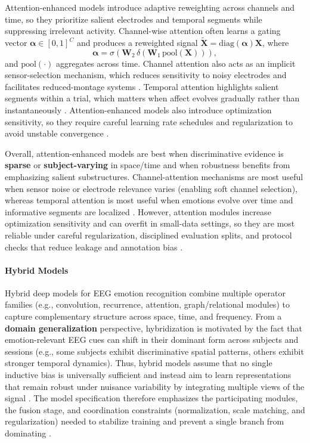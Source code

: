\documentclass{WileyMSP-template}
\begin{document}
Attention-enhanced models introduce adaptive reweighting across channels and time, so they prioritize salient electrodes and temporal segments while suppressing irrelevant activity. Channel-wise attention often learns a gating vector $\boldsymbol{\alpha}\in[0,1]^C$ and produces a reweighted signal $\tilde{\mathbf{X}}=\mathrm{diag}(\boldsymbol{\alpha})\mathbf{X}$, where \begin{equation} \boldsymbol{\alpha}=\sigma\!\left(\mathbf{W}_2\,\delta(\mathbf{W}_1\,\mathrm{pool}(\mathbf{X}))\right), \end{equation} and $\mathrm{pool}(\cdot)$ aggregates across time. Channel attention also acts as an implicit sensor-selection mechanism, which reduces sensitivity to noisy electrodes and facilitates reduced-montage systems \cite{jweijl2018learning,jxingk2018adaptive}. Temporal attention highlights salient segments within a trial, which matters when affect evolves gradually rather than instantaneously \cite{tzhang2019spatialt}. Attention-enhanced models also introduce optimization sensitivity, so they require careful learning rate schedules and regularization to avoid unstable convergence \cite{yroyhb2019deeplear}.

Overall, attention-enhanced models are best when discriminative evidence is \textbf{sparse} or \textbf{subject-varying} in space/time and when robustness benefits from emphasizing salient substructures. Channel-attention mechanisms are most useful when sensor noise or electrode relevance varies (enabling soft channel selection), whereas temporal attention is most useful when emotions evolve over time and informative segments are localized \cite{jweijl2018learning,jxingk2018adaptive,tzhang2019spatialt}. However, attention modules increase optimization sensitivity and can overfit in small-data settings, so they are most reliable under careful regularization, disciplined evaluation splits, and protocol checks that reduce leakage and annotation bias \cite{yroyhb2019deeplear}.


\paragraph{Hybrid Models}
\label{sec:hybrid_models}

Hybrid deep models for EEG emotion recognition combine multiple operator families (e.g., convolution, recurrence, attention, graph/relational modules) to capture complementary structure across space, time, and frequency. From a \textbf{domain generalization} perspective, hybridization is motivated by the fact that emotion-relevant EEG cues can shift in their dominant form across subjects and sessions (e.g., some subjects exhibit discriminative spatial patterns, others exhibit stronger temporal dynamics). Thus, hybrid models assume that no single inductive bias is universally sufficient and instead aim to learn representations that remain robust under nuisance variability by integrating multiple views of the signal \cite{sliuxw2020subjecti}. The model specification therefore emphasizes the participating modules, the fusion stage, and coordination constraints (normalization, scale matching, and regularization) needed to stabilize training and prevent a single branch from dominating \cite{shkimh2021asemoaut,megger2019emotionr}.
\end{document}
